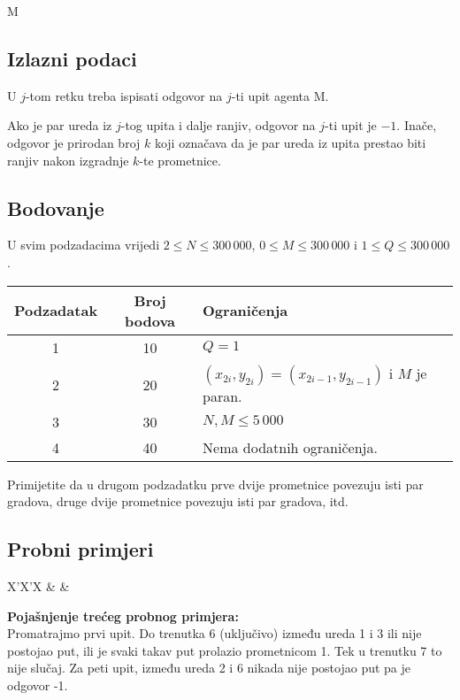 \begin{statement}[
  problempoints=100,
  timelimit=3 sekunde,
  memorylimit=512 MiB,
]{M}
\subsection*{Izlazni podaci}
U $j$-tom retku treba ispisati odgovor na $j$-ti upit agenta M.

Ako je par ureda iz $j$-tog upita i dalje ranjiv, odgovor na $j$-ti upit je $-1$.
Inače, odgovor je prirodan broj $k$ koji označava da je par ureda iz upita
prestao biti ranjiv nakon izgradnje $k$-te prometnice.


\subsection*{Bodovanje}

U svim podzadacima vrijedi $2 \le N \le 300\,000$, $0 \le M \le 300\,000$ i $1
  \le Q \le 300\,000$.

{\renewcommand{\arraystretch}{1.4}
  \setlength{\tabcolsep}{6pt}
  \begin{tabular}{ccl}
 Podzadatak & Broj bodova & Ograničenja \\ \midrule
  1 & 10 & $Q = 1$ \\
  2 & 20 & $(x_{2i}, y_{2i}) = (x_{2i-1}, y_{2i-1})$ i $M$ je paran. \\
  3 & 30 & $N, M \le 5\,000$ \\
  4 & 40 & Nema dodatnih ograničenja.
\end{tabular}}

Primijetite da u drugom podzadatku prve dvije prometnice povezuju isti par gradova,
druge dvije prometnice povezuju isti par gradova, itd.

\clearpage


\subsection*{Probni primjeri}
\begin{tabularx}{\textwidth}{X'X'X}
 &
 &
\end{tabularx}

\textbf{Pojašnjenje trećeg probnog primjera:}\\
Promatrajmo prvi upit. Do trenutka 6 (uključivo) između ureda 1 i 3 ili nije postojao put, ili je svaki takav put prolazio prometnicom 1. Tek u trenutku 7 to nije slučaj. Za peti upit, između ureda 2 i 6 nikada nije postojao put pa je odgovor -1.

\end{statement}


